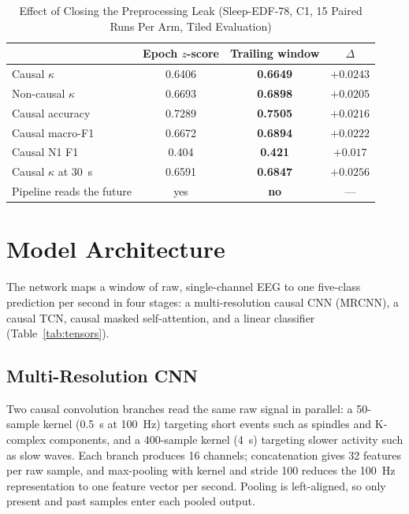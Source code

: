 \documentclass[conference]{IEEEtran}
\begin{document}
\begin{table}[t]
\caption{Effect of Closing the Preprocessing Leak (Sleep-EDF-78, C1, 15 Paired Runs Per Arm, Tiled
Evaluation)}
\label{tab:leak}
\centering
\footnotesize
\setlength{\tabcolsep}{4pt}
\begin{tabular}{lccc}
\toprule
 & Epoch $z$-score & Trailing window & $\Delta$ \\
\midrule
Causal $\kappa$         & 0.6406 & \textbf{0.6649} & $+0.0243$ \\
Non-causal $\kappa$     & 0.6693 & \textbf{0.6898} & $+0.0205$ \\
Causal accuracy         & 0.7289 & \textbf{0.7505} & $+0.0216$ \\
Causal macro-F1         & 0.6672 & \textbf{0.6894} & $+0.0222$ \\
Causal N1 F1            & 0.404  & \textbf{0.421}  & $+0.017$  \\
Causal $\kappa$ at 30~s & 0.6591 & \textbf{0.6847} & $+0.0256$ \\
\midrule
Pipeline reads the future & yes & \textbf{no} & --- \\
\bottomrule
\end{tabular}
\end{table}

\section{Model Architecture}

The network maps a window of raw, single-channel EEG to one five-class prediction per second in
four stages: a multi-resolution causal CNN (MRCNN), a causal TCN, causal masked self-attention, and
a linear classifier (Table~\ref{tab:tensors}).

\subsection{Multi-Resolution CNN}

Two causal convolution branches read the same raw signal in parallel: a 50-sample kernel (0.5~s at
100~Hz) targeting short events such as spindles and K-complex components, and a 400-sample kernel
(4~s) targeting slower activity such as slow waves. Each branch produces 16 channels; concatenation
gives 32 features per raw sample, and max-pooling with kernel and stride 100 reduces the 100~Hz
representation to one feature vector per second. Pooling is left-aligned, so only present and past
samples enter each pooled output.
\end{document}
